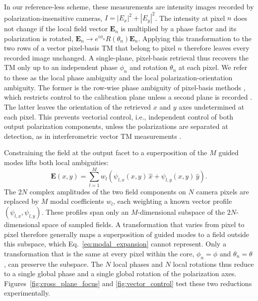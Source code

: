 \documentclass{article}
\begin{document}
In our reference-less scheme, these measurements are intensity images recorded by polarization-insensitive cameras, $I=|E_x|^2+|E_y|^2$.
The intensity at pixel $n$ does not change if the local field vector $\mathbf{E}_n$ is multiplied by a phase factor and its polarization is rotated, $\mathbf{E}_n\to e^{i\phi_n}R(\theta_n)\mathbf{E}_n$.
Applying this transformation to the two rows of a vector pixel-basis TM that belong to pixel $n$ therefore leaves every recorded image unchanged.
A single-plane, pixel-basis retrieval thus recovers the TM only up to an independent phase $\phi_n$ and rotation $\theta_n$ at each pixel.
We refer to these as the local phase ambiguity and the local polarization-orientation ambiguity.
The former is the row-wise phase ambiguity of pixel-basis methods \cite{dremeau2015, nonconvex_opt}, which restricts control to the calibration plane unless a second plane is recorded \cite{zhong2023, retrieving_the_complex_TM}.
The latter leaves the orientation of the retrieved $x$ and $y$ axes undetermined at each pixel.
This prevents vectorial control, i.e., independent control of both output polarization components, unless the polarizations are separated at detection, as in interferometric vector TM measurements \cite{tripathi2012, xie2017}.

Constraining the field at the output facet to a superposition of the $M$ guided modes lifts both local ambiguities:
\begin{equation}
\label{eq:modal_expansion}
\mathbf{E}(x,y)=\sum_{l=1}^{M} w_l\left(\psi_{l,x}(x,y)\,\hat{x}+\psi_{l,y}(x,y)\,\hat{y}\right).
\end{equation}
The $2N$ complex amplitudes of the two field components on $N$ camera pixels are replaced by $M$ modal coefficients $w_l$, each weighting a known vector profile $(\psi_{l,x},\psi_{l,y})$.
These profiles span only an $M$-dimensional subspace of the $2N$-dimensional space of sampled fields.
A transformation that varies from pixel to pixel therefore generally maps a superposition of guided modes to a field outside this subspace, which Eq.~\eqref{eq:modal_expansion} cannot represent.
Only a transformation that is the same at every pixel within the core, $\phi_n=\phi$ and $\theta_n=\theta$, can preserve the subspace.
The $N$ local phases and $N$ local rotations thus reduce to a single global phase and a single global rotation of the polarization axes.
Figures~\ref{fig:cross_plane_focus} and \ref{fig:vector_control} test these two reductions experimentally.
\end{document}
